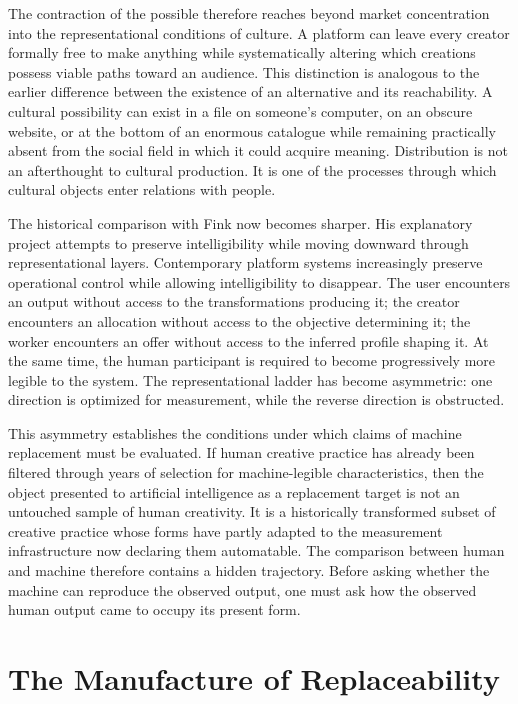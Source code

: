 \documentclass[11pt]{article}
\begin{document}
The contraction of the possible therefore reaches beyond market concentration into the representational conditions of culture. A platform can leave every creator formally free to make anything while systematically altering which creations possess viable paths toward an audience. This distinction is analogous to the earlier difference between the existence of an alternative and its reachability. A cultural possibility can exist in a file on someone's computer, on an obscure website, or at the bottom of an enormous catalogue while remaining practically absent from the social field in which it could acquire meaning. Distribution is not an afterthought to cultural production. It is one of the processes through which cultural objects enter relations with people.

The historical comparison with Fink now becomes sharper. His explanatory project attempts to preserve intelligibility while moving downward through representational layers. Contemporary platform systems increasingly preserve operational control while allowing intelligibility to disappear. The user encounters an output without access to the transformations producing it; the creator encounters an allocation without access to the objective determining it; the worker encounters an offer without access to the inferred profile shaping it. At the same time, the human participant is required to become progressively more legible to the system. The representational ladder has become asymmetric: one direction is optimized for measurement, while the reverse direction is obstructed.

This asymmetry establishes the conditions under which claims of machine replacement must be evaluated. If human creative practice has already been filtered through years of selection for machine-legible characteristics, then the object presented to artificial intelligence as a replacement target is not an untouched sample of human creativity. It is a historically transformed subset of creative practice whose forms have partly adapted to the measurement infrastructure now declaring them automatable. The comparison between human and machine therefore contains a hidden trajectory. Before asking whether the machine can reproduce the observed output, one must ask how the observed human output came to occupy its present form.

\section{The Manufacture of Replaceability}
\end{document}
